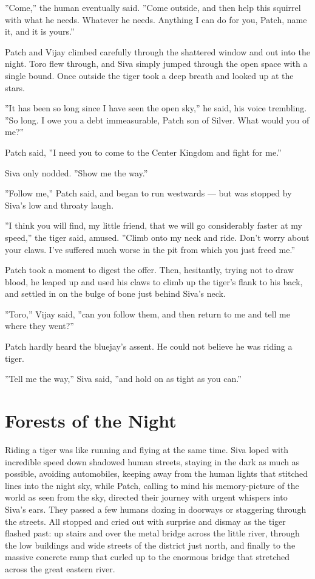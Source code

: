 \documentclass[12pt]{book}
\begin{document}
''Come,'' the human eventually said. ''Come outside, and then help this squirrel with what he needs. Whatever he needs. Anything I can do for you, Patch, name it, and it is yours.''

Patch and Vijay climbed carefully through the shattered window and out into the night. Toro flew through, and Siva simply jumped through the open space with a single bound. Once outside the tiger took a deep breath and looked up at the stars.

''It has been so long since I have seen the open sky,'' he said, his voice trembling. ''So long. I owe you a debt immeasurable, Patch son of Silver. What would you of me?''

Patch said, ''I need you to come to the Center Kingdom and fight for me.''

Siva only nodded. ''Show me the way.''

''Follow me,'' Patch said, and began to run westwards ---
but was stopped by Siva's low and throaty laugh.

''I think you will find, my little friend, that we will go considerably faster at my speed,'' the tiger said, amused. ''Climb onto my neck and ride. Don't worry about your claws. I've suffered much worse in the pit from which you just freed me.''

Patch took a moment to digest the offer. Then, hesitantly, trying not to draw blood, he leaped up and used his claws to climb up the tiger's flank to his back, and settled in on the bulge of bone just behind Siva's neck.

''Toro,'' Vijay said, ''can you follow them, and then return to me and tell me where they went?''

Patch hardly heard the bluejay's assent. He could not believe he was riding a tiger.

''Tell me the way,'' Siva said, ''and hold on as tight as you can.''


\section{Forests of the Night}

Riding a tiger was like running and flying at the same time. Siva loped with incredible speed down shadowed human streets, staying in the dark as much as possible, avoiding automobiles, keeping away from the human lights that stitched lines into the night sky, while Patch, calling to mind his memory-picture of the world as seen from the sky, directed their journey with urgent whispers into Siva's ears. They passed a few humans dozing in doorways or staggering through the streets. All stopped and cried out with surprise and dismay as the tiger flashed past: up stairs and over the metal bridge across the little river, through the low buildings and wide streets of the district just north, and finally to the massive concrete ramp that curled up to the enormous bridge that stretched across the great eastern river.
\end{document}
